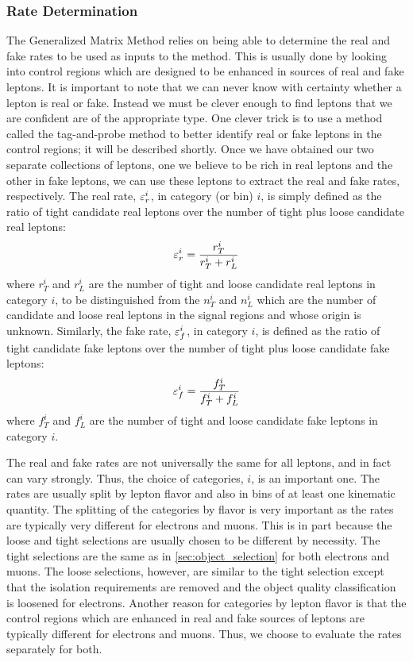 \subsubsection{Rate Determination}
\label{sec:fake_and_real_rates}

The Generalized Matrix Method relies on being able to determine
the real and fake rates to be used as inputs to the method.
This is usually done by looking into control regions
which are designed to be enhanced in sources of real and fake leptons.
It is important to note that we can never know with certainty 
whether a lepton is real or fake. Instead we must be clever enough
to find leptons that we are confident are of the appropriate type.
One clever trick is to use a method called the tag-and-probe method
to better identify real or fake leptons in the control regions;
it will be described shortly.
Once we have obtained our two separate collections of leptons,
one we believe to be rich in real leptons and the other in fake leptons,
we can use these leptons to extract the real and fake rates, respectively.
The real rate, $\varepsilon_r^i$, in category (or bin) $i$,
is simply defined as the ratio of tight candidate real leptons
over the number of tight plus loose candidate real leptons:
\begin{equation}
\label{eq:real_rate}
\varepsilon_r^i = \frac{r_T^i}{r_T^i+r_L^i}
\end{equation}
where $r_T^i$ and $r_L^i$ are the number of tight and loose candidate
real leptons in category $i$, to be 
distinguished from the $n_T^i$ and $n_L^i$ which
are the number of candidate and loose real leptons in the signal regions
and whose origin is unknown.
Similarly, the fake rate, $\varepsilon_f^i$, in category $i$, 
is defined as the ratio of tight candidate fake leptons over
the number of tight plus loose candidate fake leptons:
\begin{equation}
\label{eq:fake_rate}
\varepsilon_f^i = \frac{f_T^i}{f_T^i+f_L^i}
\end{equation}
where $f_T^i$ and $f_L^i$ are the number of tight and loose candidate
fake leptons in category $i$.

The real and fake rates are not universally the same for all leptons, 
and in fact can vary strongly. Thus, the choice of categories, $i$, is
an important one. The rates are usually split by lepton
flavor and also in bins of at least one kinematic quantity.
The splitting of the categories by flavor is 
very important as the rates are 
typically very different for electrons and muons. 
This is in part because
the loose and tight selections are usually chosen to be different
by necessity.
The tight selections are the same as in \sec\ref{sec:object_selection}
for both electrons and muons.  The loose selections, however,
are similar to the tight selection except that
the isolation requirements are removed and the object quality 
classification is loosened for electrons.
Another reason for categories by lepton flavor
is that the control regions which are enhanced in real and fake sources
of leptons are typically different for electrons and muons.
Thus, we choose to evaluate the rates separately for both.


